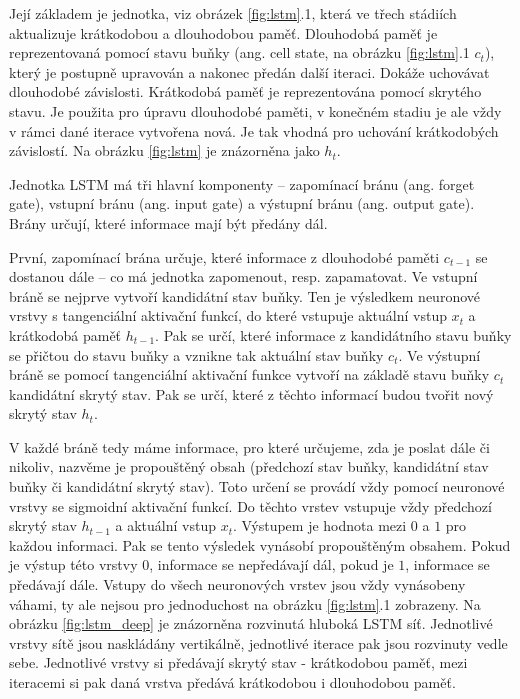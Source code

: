 Její základem je jednotka, viz obrázek \ref{fig:lstm}.1, která ve třech
stádiích aktualizuje krátkodobou a dlouhodobou paměť. Dlouhodobá paměť je
reprezentovaná pomocí stavu buňky (ang. cell state, na obrázku \ref{fig:lstm}.1
$c_t$), který je postupně upravován a nakonec předán další iteraci. Dokáže
uchovávat dlouhodobé závislosti. Krátkodobá paměť je reprezentována pomocí
skrytého stavu. Je použita pro úpravu dlouhodobé paměti, v konečném stadiu je
ale vždy v rámci dané iterace vytvořena nová. Je tak vhodná pro uchování
krátkodobých závislostí. Na obrázku \ref{fig:lstm} je znázorněna jako $h_t$.

Jednotka LSTM má tři hlavní komponenty – zapomínací bránu (ang. forget gate),
vstupní bránu (ang. input gate) a výstupní bránu (ang. output gate). Brány
určují, které informace mají být předány dál.

První, zapomínací brána určuje, které informace z dlouhodobé paměti $c_{t-1}$
se dostanou dále – co má jednotka zapomenout, resp. zapamatovat. Ve vstupní
bráně se nejprve vytvoří kandidátní stav buňky. Ten je výsledkem neuronové
vrstvy s tangenciální aktivační funkcí, do které vstupuje aktuální vstup $x_t$
a krátkodobá paměť $h_{t-1}$. Pak se určí, které informace z kandidátního stavu
buňky se přičtou do stavu buňky a vznikne tak aktuální stav buňky $c_t$. Ve
výstupní bráně se pomocí tangenciální aktivační funkce vytvoří na základě stavu
buňky $c_t$ kandidátní skrytý stav. Pak se určí, které z těchto informací budou
tvořit nový skrytý stav $h_t$.

V každé bráně tedy máme informace, pro které určujeme, zda je poslat dále či
nikoliv, nazvěme je propouštěný obsah (předchozí stav buňky, kandidátní stav
buňky či kandidátní skrytý stav). Toto určení se provádí vždy pomocí neuronové
vrstvy se sigmoidní aktivační funkcí. Do těchto vrstev vstupuje vždy předchozí
skrytý stav $h_{t-1}$ a aktuální vstup $x_t$. Výstupem je hodnota mezi $0$ a
$1$ pro každou informaci. Pak se tento výsledek vynásobí propouštěným obsahem.
Pokud je výstup této vrstvy $0$, informace se nepředávají dál, pokud je $1$,
informace se předávají dále. Vstupy do všech neuronových vrstev jsou vždy
vynásobeny váhami, ty ale nejsou pro jednoduchost na obrázku \ref{fig:lstm}.1
zobrazeny. Na obrázku \ref{fig:lstm_deep} je znázorněna rozvinutá hluboká LSTM
síť. Jednotlivé vrstvy sítě jsou naskládány vertikálně, jednotlivé iterace pak
jsou rozvinuty vedle sebe. Jednotlivé vrstvy si předávají skrytý stav -
krátkodobou paměť, mezi iteracemi si pak daná vrstva předává krátkodobou i
dlouhodobou paměť.

